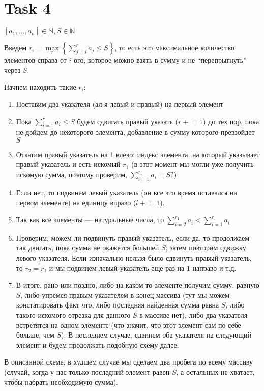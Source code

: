 \section{Task 4}
\begin{center}
$[a_1, \ldots, a_n] \in \mathds{N}, S \in \mathds{N}$
\end{center}
Введем $r_i = \max\limits_{r}\left\{\sum\limits_{j=i}^{r}a_j \leq S\right\}$, то есть это максимальное количество элементов справа от $i$-ого, которое можно взять в сумму и не ``перепрыгнуть'' через $S$.

Начнем находить такие $r_i$:
\begin{enumerate}
    \item Поставим два указателя (ал-я левый и правый) на первый элемент
    \item Пока $\sum\limits_{i=1}^{r}a_i \leq S$ будем сдвигать правый указать ($r +\!\!= 1$) до тех пор, пока не дойдем до некоторого элемента, добавление в сумму которого превзойдет $S$
    \item Откатим правый указатель на 1 влево: индекс элемента, на который указывает правый указатель и есть искомый $r_1$ (в этот момент мы могли уже получить искомую сумма, поэтому проверим, $\sum\limits_{i=1}^{r_1}a_i = S?$)
    \item Если нет, то подвинем левый указатель (он все это время оставался на первом элементе) на единицу вправо ($l +\!\!= 1$).
    \item Так как все элементы --- натуральные числа, то $\sum\limits_{i=2}^{r_1}a_i < \sum\limits_{i=1}^{r_1}a_i$
    \item Проверим, можем ли подвинуть правый указатель, если да, то продолжаем так двигать, пока сумма не окажется большей $S$, затем повторим сдвижку левого указателя. Если изначально нельзя было сдвинуть правый указатель, то $r_2 = r_1$ и мы подвинем левый указатель еще раз на $1$ направо и т.д.
    \item В итоге, рано или поздно, либо на каком-то элементе получим сумму, равную $S$, либо упремся правым указателем в конец массива (тут мы можем констатировать факт что, либо последняя найденная сумма равна $S$, либо такого искомого отрезка для данного $S$ в массиве нет), либо два указателя встретятся на одном элементе (что значит, что этот элемент сам по себе больше, чем $S$). В последнем случае, сдвинем оба указателя на следующий элемент и будем продолжать подобную схему далее.
\end{enumerate}
В описанной схеме, в худшем случае мы сделаем два пробега по всему массиву (случай, когда у нас только последний элемент равен $S$, а остальных не хватает, чтобы набрать необходимую сумма).